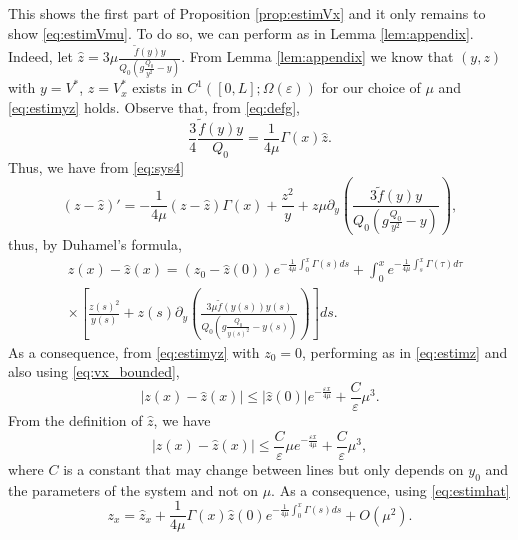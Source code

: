 \documentclass[11pt]{article}
\begin{document}
This shows the first part of Proposition \ref{prop:estimVx} and it only remains to show \eqref{eq:estimVmu}. To do so, we can perform as in Lemma \ref{lem:appendix}.
Indeed, let $\hat{z}= 3\mu \frac{\tilde{f}(y)y}{Q_{0}\left(g \frac{Q_{0}}{y^{2}}-y\right)}$. From Lemma \ref{lem:appendix} we know that $(y,z)$ with $y=V^{*}$, $z=V_{x}^{*}$ exists in $C^{1}([0,L];\Omega(\varepsilon))$ for our choice of $\mu$ and \eqref{eq:estimyz} holds.
Observe that, from \eqref{eq:defg},
\begin{equation}
\frac{3}{4}\frac{\tilde{f}(y)y}{Q_{0}} = \frac{1}{4\mu}{\Gamma(x)}\hat{z}.
\end{equation}
Thus, we have from \eqref{eq:sys4}
\begin{equation}
    (z-\hat{z})' = -\frac{1}{4\mu}(z-\hat{z}){\Gamma(x)}+\frac{z^{2}}{y}+z\mu\partial_{y}\left(\frac{3\tilde{f}(y)y}{Q_{0}\left(g \frac{Q_{0}}{y^{2}}-y\right)}\right),
\end{equation}
thus, by Duhamel's formula,
\begin{equation}
\begin{split}
\label{eq:estimhat}
&z(x)-\hat{z}(x) = (z_{0}-\hat{z}(0))e^{-\frac{1}{4\mu}\int_{0}^{x}{\Gamma(s)}d{s}}+\int_{0}^{x} e^{-\frac{1}{4\mu}\int_{s}^{x}{\Gamma(\tau)}d\tau}\\& 
\times\left[\frac{z(s)^{2}}{y(s)}+z(s)\partial_{y}\left(\frac{3\mu\tilde{f}(y(s))y(s)}{Q_{0}\left(g \frac{Q_{0}}{y(s)^{2}}-y(s)\right)}\right)\right]ds.
\end{split}
\end{equation}
As a consequence, from \eqref{eq:estimyz} with $z_{0}=0$, performing as in \eqref{eq:estimz} {and also using \eqref{eq:vx_bounded},}
\begin{equation}
    |z(x)-\hat{z}(x)|\leq |\hat{z}(0)|e^{-\frac{\varepsilon x}{4\mu}} + \frac{C}{\varepsilon}\mu^{3}.
\end{equation}
From the definition of $\hat{z}$, we have
\begin{equation}
    |z(x)-\hat{z}(x)|\leq \frac{C}{\varepsilon}\mu e^{-\frac{\varepsilon x}{4\mu}} + \frac{C}{\varepsilon}\mu^{3},
\end{equation}
where $C$ is a constant that may change between lines but only depends on $y_{0}$ and the parameters of the system and not on $\mu$.
As a consequence, using \eqref{eq:estimhat}
\begin{equation}
z_{x} = \hat{z}_{x} +\frac{1}{4\mu}{\Gamma(x)}\hat{z}(0)e^{-\frac{1}{4\mu}\int_{0}^{x}{\Gamma(s)}d{s}}+O(\mu^{2}).
\end{equation}
\end{document}
